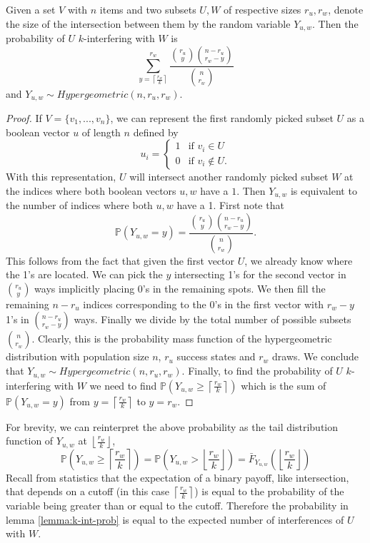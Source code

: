 \begin{lemma}
    \label{lemma:k-int-prob}
	Given a set $V$ with $n$ items and two subsets $U,W$ of respective sizes $r_u,r_w$, denote the size of the intersection between them by the random variable $Y_{u,w}$. Then the probability of $U$ $k$-interfering with $W$ is $$\sum_{y = \left\lceil \frac{r_w}{k} \right\rceil}^{r_w} \frac{\binom{r_u}{y} \binom{n-r_u}{r_w-y}}{\binom{n}{r_w}}$$ and $Y_{u,w} \sim Hypergeometric(n, r_u, r_w)$.
\end{lemma}
\begin{proof}
	If $V = \{v_1,...,v_n\}$, we can represent the first randomly picked subset $U$ as a boolean vector $u$ of length $n$ defined by
    $$
    u_i = \begin{cases}
        1 & \text{if } v_i \in U \\
        0 & \text{if } v_i \notin U.
    \end{cases}
    $$
    With this representation, $U$ will intersect another randomly picked subset $W$ at the indices where both boolean vectors $u, w$ have a $1$. Then $Y_{u,w}$ is equivalent to the number of indices where both $u, w$ have a 1. First note that
    \begin{equation}
        \mathbb{P}(Y_{u,w}=y) = \frac{\binom{r_u}{y} \binom{n-r_u}{r_w-y}}{\binom{n}{r_w}}.
    \end{equation}
    This follows from the fact that given the first vector $U$, we already know where the 1's are located. We can pick the $y$ intersecting 1's for the second vector in $\binom{r_u}{y}$ ways implicitly placing 0's in the remaining spots. We then fill the remaining $n-r_u$ indices corresponding to the 0's in the first vector with $r_w-y$ 1's in $\binom{n-r_u}{r_w-y}$ ways. Finally we divide by the total number of possible subsets $\binom{n}{r_w}$. Clearly, this is the probability mass function of the hypergeometric distribution with population size $n$, $r_u$ success states and $r_w$ draws. We conclude that $Y_{u,w} \sim Hypergeometric(n, r_u, r_w)$. Finally, to find the probability of $U$ $k$-interfering with $W$ we need to find $\mathbb{P}(Y_{u,w} \ge \left\lceil \frac{r_w}{k} \right\rceil)$ which is the sum of $\mathbb{P}(Y_{u,w}=y)$ from $y = \left\lceil \frac{r_w}{k} \right\rceil$ to $y = r_w$.
\end{proof}

For brevity, we can reinterpret the above probability as the tail distribution function of $Y_{u,w}$ at $\left\lfloor \frac{r_w}{k} \right\rfloor$, 
$$
\mathbb{P}\left(Y_{u,w} \geq \left\lceil \frac{r_w}{k} \right\rceil\right) = \mathbb{P}\left(Y_{u,w} > \left\lfloor \frac{r_w}{k} \right\rfloor\right) = \bar{F}_{Y_{u,w}}\left(\left\lfloor \frac{r_w}{k} \right\rfloor\right)
$$
Recall from statistics that the expectation of a binary payoff, like intersection, that depends on a cutoff (in this case $\left\lceil \frac{r_w}{k} \right\rceil$) is equal to the probability of the variable being greater than or equal to the cutoff. Therefore the probability in lemma \ref{lemma:k-int-prob} is equal to the expected number of interferences of $U$ with $W$. 

